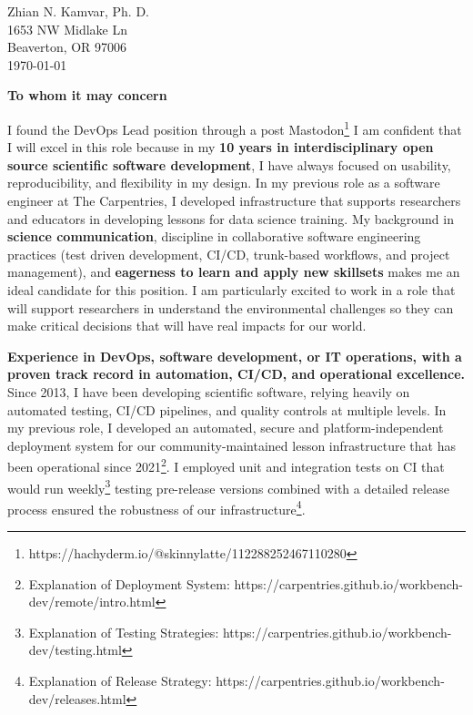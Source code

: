 


\clearpage
\begin{flushright}
  Zhian N. Kamvar, Ph. D.\\
  1653 NW Midlake Ln\\
  Beaverton, OR 97006\\
  \today
\end{flushright}

\textbf{To whom it may concern}

\vspace{2ex}

I found the DevOps Lead position through a post 
Mastodon\footnote{https://hachyderm.io/@skinnylatte/112288252467110280} 
I am confident that I will excel in
this role because in my \textbf{10 years in interdisciplinary open source
scientific software development}, I have always focused on usability,
reproducibility, and flexibility in my design.
In my previous role as a software engineer at The Carpentries, I developed
infrastructure that supports researchers and educators in developing lessons
for data science training.
My background in \textbf{science communication}, discipline in collaborative
software engineering practices (test driven development, CI/CD, trunk-based
workflows, and project management), and \textbf{eagerness to learn and apply
new skillsets} makes me an ideal candidate for this position. 
I am particularly excited to work in a role that will support researchers in
understand the environmental challenges so they can make critical decisions
that will have real impacts for our world.



\vspace{2ex}

\textbf{Experience in DevOps, software development, or IT operations, with a proven track record in automation, CI/CD, and operational excellence.}\\
Since 2013, I have been developing scientific software, relying heavily on
automated testing, CI/CD pipelines, and quality controls at multiple levels.
In my previous role, I developed an automated, secure and platform-independent deployment system for our community-maintained lesson infrastructure that has been operational since 2021\footnote{Explanation of Deployment System: https://carpentries.github.io/workbench-dev/remote/intro.html}. I employed unit and integration tests on CI that would run weekly\footnote{Explanation of Testing Strategies: https://carpentries.github.io/workbench-dev/testing.html} testing pre-release versions combined with a detailed release process ensured the robustness of our infrastructure\footnote{Explanation of Release Strategy: https://carpentries.github.io/workbench-dev/releases.html}.

